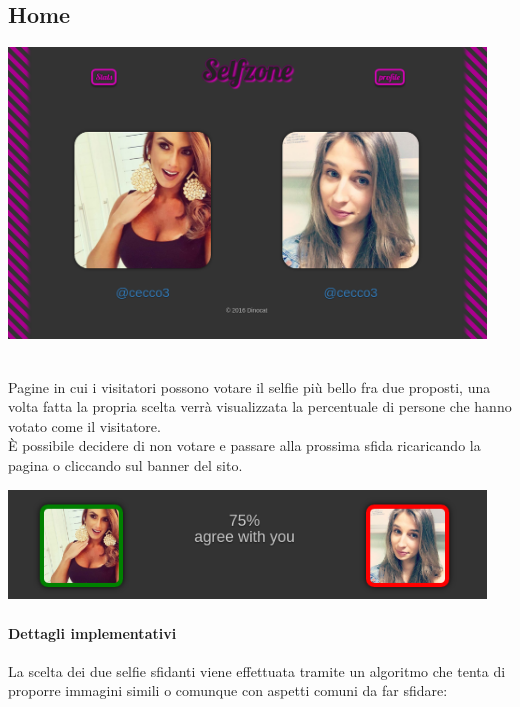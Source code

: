 \documentclass{article}
\begin{document}
\subsection{Home}
\begin{center}\includegraphics[width=0.95\textwidth]{res/home.png}\end{center}\\
Pagine in cui i visitatori possono votare il selfie più bello fra due proposti, una volta fatta la propria scelta verrà
visualizzata la percentuale di persone che hanno votato come il visitatore.\\
\`E possibile decidere di non votare e passare alla prossima sfida ricaricando la pagina o cliccando sul banner del sito.\\
\begin{center}\includegraphics[width=0.95\textwidth]{res/home2.png}\end{center}

\paragraph{Dettagli implementativi}
La scelta dei due selfie sfidanti viene effettuata tramite un algoritmo che tenta di proporre immagini simili o comunque
con aspetti comuni da far sfidare:
\end{document}
